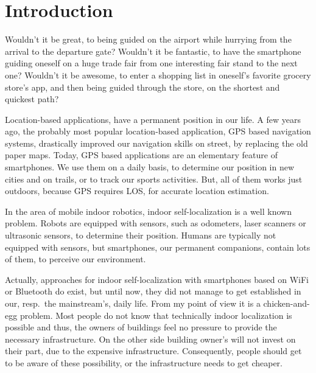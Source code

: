 \chapter{Introduction} \label{chap:intro}

Wouldn't it be great, to being guided on the airport while hurrying from the arrival to the departure gate? Wouldn't it be fantastic, to have the smartphone guiding oneself on a huge trade fair from one interesting fair stand to the next one? Wouldn't it be awesome, to enter a shopping list in oneself's favorite grocery store's app, and then being guided through the store, on the shortest and quickest path?

Location-based applications, have a permanent position in our life. A few years ago, the probably most popular location-based application, \acs{GPS} based navigation systems, drastically improved our navigation skills on street, by replacing the old paper maps. Today, \acs{GPS} based applications are an elementary feature of smartphones. We use them on a daily basis, to determine our position in new cities and on trails, or to track our sports activities. But, all of them works just outdoors, because \acs{GPS} requires \acl{LOS}, for accurate location estimation.

In the area of mobile indoor robotics, indoor self-localization is a well known problem. Robots are equipped with sensors, such as odometers, laser scanners or ultrasonic sensors, to determine their position. Humans are typically not equipped with sensors, but smartphones, our permanent companions, contain lots of them, to perceive our environment.

Actually, approaches for indoor self-localization with smartphones based on WiFi or Bluetooth do exist, but until now, they did not manage to get established in our, resp.\ the mainstream's, daily life. From my point of view it is a chicken-and-egg problem. Most people do not know that technically indoor localization is possible and thus, the owners of buildings feel no pressure to provide the necessary infrastructure. On the other side building owner's will not invest on their part, due to the expensive infrastructure. Consequently, people should get to be aware of these possibility, or the infrastructure needs to get cheaper.

